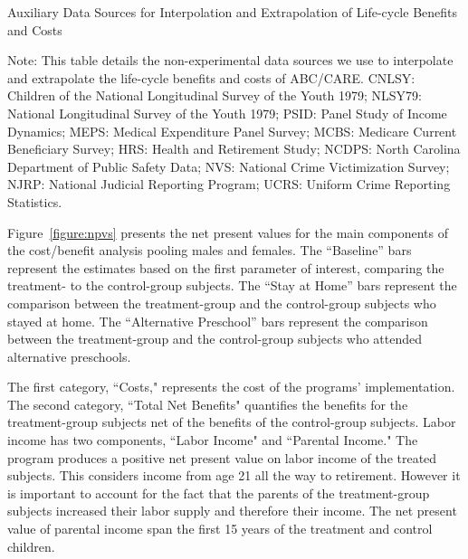 \begin{table}[!htbp]
\begin{threeparttable}
\caption{Auxiliary Data Sources for Interpolation and Extrapolation of Life-cycle Benefits and Costs} \label{table:sources}
\footnotesize

\begin{tablenotes}
\footnotesize
Note: This table details the non-experimental data sources we use to interpolate and extrapolate the life-cycle benefits and costs of ABC/CARE. CNLSY: Children of the National Longitudinal Survey of the Youth 1979; NLSY79: National Longitudinal Survey of the Youth 1979; PSID: Panel Study of Income Dynamics; MEPS: Medical Expenditure Panel Survey; MCBS: Medicare Current Beneficiary Survey; HRS: Health and Retirement Study; NCDPS: North Carolina Department of Public Safety Data; NVS: National Crime Victimization Survey; NJRP: National Judicial Reporting Program; UCRS: Uniform Crime Reporting Statistics.
\end{tablenotes}
\end{threeparttable}
\end{table}

Figure~\ref{figure:npvs} presents the net present values for the main components of the cost/benefit analysis pooling males and females. The ``Baseline'' bars represent the estimates based on the first parameter of interest, comparing the treatment- to the control-group subjects. The ``Stay at Home'' bars represent the comparison between the treatment-group and the control-group subjects who stayed at home. The ``Alternative Preschool'' bars represent the comparison between the treatment-group and the control-group subjects who attended alternative preschools.

The first category, ``Costs," represents the cost of the programs' implementation. The second category, ``Total Net Benefits" quantifies the benefits for the treatment-group subjects net of the benefits of the control-group subjects. Labor income has two components, ``Labor Income" and ``Parental Income." The program produces a positive net present value on labor income of the treated subjects. This considers income from age 21 all the way to retirement. However it is important to account for the fact that the parents of the treatment-group subjects increased their labor supply and therefore their income. The net present value of parental income span the first 15 years of the treatment and control children.

